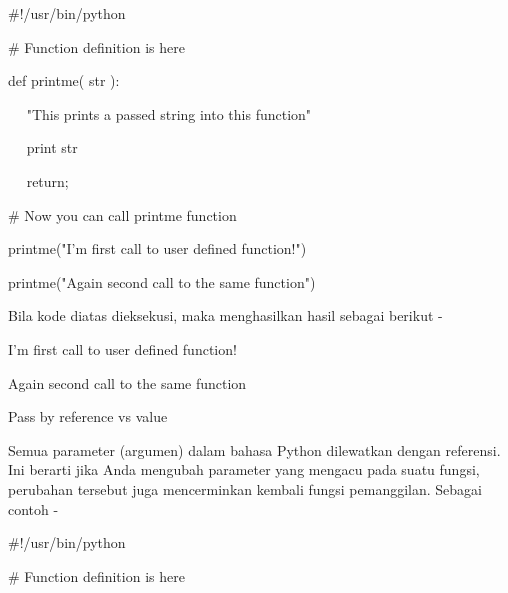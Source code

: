 \noindent 
 \hspace*{0.5in}  $  \#  $!/usr/bin/python \par
\vspace{12pt}
\noindent 
 \hspace*{0.5in}  $  \#  $ Function definition is here \par
\noindent 
 \hspace*{0.5in} def printme( str ): \par
\noindent 
~~  \hspace*{0.5in}  \hspace*{0.5in} "This prints a passed string into this function" \par
\noindent 
~~  \hspace*{0.5in} print str \par
\noindent 
~~  \hspace*{0.5in} return; \par
\vspace{12pt}
\noindent 
 \hspace*{0.5in}  $  \#  $ Now you can call printme function \par
\noindent 
 \hspace*{0.5in} printme("I'm first call to user defined function!") \par
\noindent 
 \hspace*{0.5in} printme("Again second call to the same function") \par
\noindent 
Bila kode diatas dieksekusi, maka menghasilkan hasil sebagai berikut - \par
\noindent 
 \hspace*{0.5in} I'm first call to user defined function! \par
\noindent 
 \hspace*{0.5in} Again second call to the same function \par
\vspace{12pt}
\noindent 
Pass by reference vs value \par
\noindent 
Semua parameter (argumen) dalam bahasa Python dilewatkan dengan referensi. Ini berarti jika Anda mengubah parameter yang mengacu pada suatu fungsi, perubahan tersebut juga mencerminkan kembali fungsi pemanggilan. Sebagai contoh - \par
\noindent 
 \hspace*{0.5in}  $  \#  $!/usr/bin/python \par
\vspace{12pt}
\noindent 
 \hspace*{0.5in}  $  \#  $ Function definition is here \par
